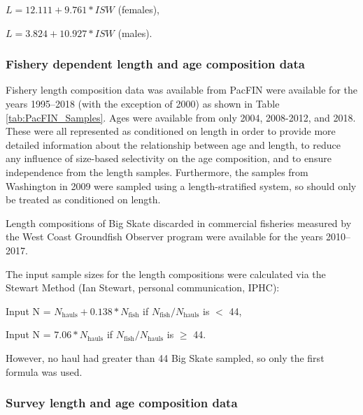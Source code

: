 \documentclass[12pt,]{article}
\begin{document}
\begin{centering}

$L = 12.111 + 9.761*ISW$ (females),

$L = 3.824 + 10.927*ISW$ (males).

\end{centering}

\hypertarget{fishery-dependent-length-and-age-composition-data}{%
\subsubsection{Fishery dependent length and age composition
data}\label{fishery-dependent-length-and-age-composition-data}}

Fishery length composition data was available from PacFIN were available
for the years 1995--2018 (with the exception of 2000) as shown in Table
\ref{tab:PacFIN_Samples}. Ages were available from only 2004, 2008-2012,
and 2018. These were all represented as conditioned on length in order
to provide more detailed information about the relationship between age
and length, to reduce any influence of size-based selectivity on the age
composition, and to ensure independence from the length samples.
Furthermore, the samples from Washington in 2009 were sampled using a
length-stratified system, so should only be treated as conditioned on
length.

Length compositions of Big Skate discarded in commercial fisheries
measured by the West Coast Groundfish Observer program were available
for the years 2010--2017.

The input sample sizes for the length compositions were calculated via
the Stewart Method (Ian Stewart, personal communication, IPHC):

\begin{centering}

Input N = $N_{\text{hauls}} + 0.138 * N_{\text{fish}}$ if $N_{\text{fish}}/N_{\text{hauls}}$ is $<$ 44,

Input N = $7.06 * N_{\text{hauls}}$ if $N_{\text{fish}}/N_{\text{hauls}}$ is $\geq$ 44.

\end{centering}

However, no haul had greater than 44 Big Skate sampled, so only the
first formula was used.

\hypertarget{survey-length-and-age-composition-data}{%
\subsubsection{Survey length and age composition
data}\label{survey-length-and-age-composition-data}}
\end{document}
